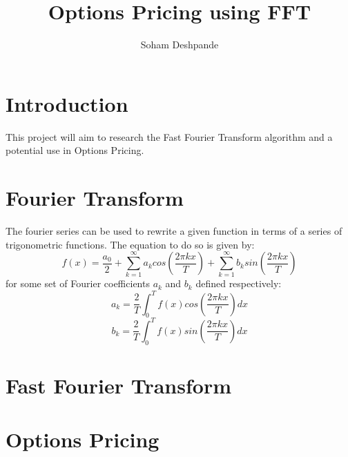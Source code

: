 \documentclass[12pt]{article}
\begin{document}
\title{Options Pricing using FFT }
\author{Soham Deshpande}
\maketitle
\clearpage
\tableofcontents
\clearpage

\section{Introduction}
This project will aim to research the Fast Fourier Transform algorithm and a potential use in Options Pricing.

\clearpage
\section{Fourier Transform}
The fourier series can be used to rewrite a given function in terms of a series of trigonometric functions.
The equation to do so is given by:
$$f(x) = \frac{a_0}{2} + \sum^\infty_{k=1}a_k cos(\frac{2\pi kx}{T}) + \sum^\infty_{k=1}b_k sin(\frac{2\pi kx}{T}) $$
for some set of Fourier coefficients $a_k$ and $b_k$ defined respectively:
$$a_k = \frac{2}{T}\int^T_0 f(x)cos(\frac{2\pi kx}{T})dx$$
$$b_k = \frac{2}{T}\int^T_0 f(x)sin(\frac{2\pi kx}{T})dx$$

\clearpage
\section{Fast Fourier Transform}





\clearpage
\section{Options Pricing}
\end{document}

